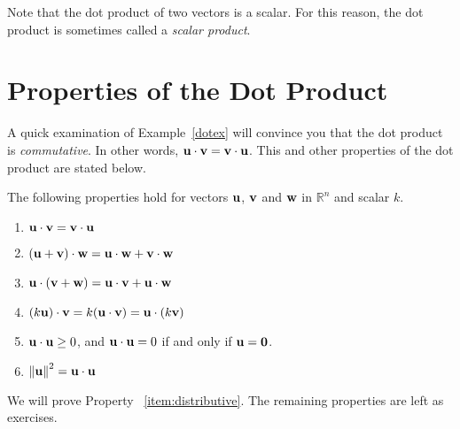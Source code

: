 \documentclass{ximera}
\renewcommand{\vec}[1]{{\bf #1}}
\newcommand{\RR}{\mathbb{R}}
\newcommand{\dfn}{\textit}
\newcommand{\dotp}{\cdot}
\newcommand\norm[1]{\left\lVert#1\right\rVert}
\begin{document}
Note that the dot product of two vectors is a scalar.  For this reason, the dot product is sometimes called a \dfn{scalar product}.

\section*{Properties of the Dot Product}

A quick examination of Example~\ref{dotex} will convince you that the dot product is \dfn{commutative}. In other words, $\vec{u}\dotp\vec{v}=\vec{v}\dotp\vec{u}$.  This and other properties of the dot product are stated below.

\begin{theorem}\label{th:dotproductproperties} The following properties hold for
  vectors $\vec{u}$, $\vec{v}$ and $\vec{w}$ in $\RR^n$ and scalar
  $k$.
  \begin{enumerate}
  \item\label{item:commutative}
    $\vec{u}\dotp\vec{v}=\vec{v}\dotp\vec{u}$
   
  \item\label{item:distributive} $(\vec{u}+\vec{v})\dotp \vec{w}=\vec{u}\dotp \vec{w}+\vec{v}\dotp \vec{w}$
   
  \item\label{item:distributive-again} $\vec{u}\dotp (\vec{v}+\vec{w})=\vec{u}\dotp\vec{v}+\vec{u}\dotp \vec{w}$
   
  \item\label{item:scalar} $(k\vec{u})\dotp \vec{v}=k(\vec{u}\dotp\vec{v})=\vec{u}\dotp (k\vec{v})$
   
  \item \label{item:positive} $\vec{u}\dotp\vec{u}\geq 0$, and $\vec{u}\dotp\vec{u}=0$ if and only if $\vec{u}={\bf 0}$.
   
  \item \label{item:norm}
    $\norm{\vec{u}}^2=\vec{u}\dotp\vec{u}$
  \end{enumerate}
\end{theorem}

We will prove Property ~\ref{item:distributive}.  The remaining properties are left as exercises.
\end{document}
